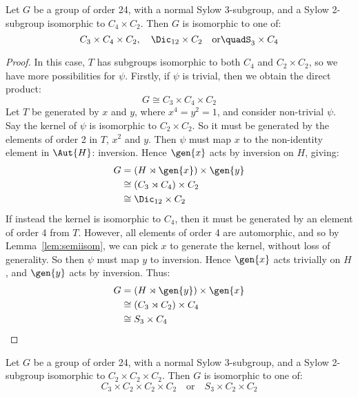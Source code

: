\begin{lemma}
    Let \(G\) be a group of order 24, with a normal Sylow 3-subgroup, and a Sylow 2-subgroup isomorphic to \(C_{4}
    \times C_2\).
    Then \(G\) is isomorphic to one of:
    \[
        C_3 \times C_4 \times C_2, \quad%
        \Dic_{12} \times C_2 \quad \text{or} \quad%
        S_3 \times C_4%
    \]
\end{lemma}

\begin{proof}
    In this case, \(T\) has subgroups isomorphic to both \(C_4\) and \(C_2 \times C_2\), so we have more
    possibilities for \(\psi\).
    Firstly, if \(\psi\) is trivial, then we obtain the direct product:
    \[G \cong C_3 \times C_4 \times C_2\]
    Let \(T\) be generated by \(x\) and \(y\), where \(x^4 = y^2 = 1\), and consider non-trivial \(\psi\).
    Say the kernel of \(\psi\) is isomorphic to \(C_2 \times C_2\).
    So it must be generated by the elements of order 2 in \(T\), \(x^2\) and \(y\).
    Then \(\psi\) must map \(x\) to the non-identity element in \(\Aut{H}\): inversion.
    Hence \(\gen{x}\) acts by inversion on \(H\), giving:
    \begin{equation*}
    \begin{aligned}
        G &= (H \rtimes \gen{x}) \times \gen{y} \\
        &\cong (C_3 \rtimes C_4) \times C_2 \\
        &\cong \Dic_{12} \times C_2
    \end{aligned}
    \end{equation*}
    If instead the kernel is isomorphic to \(C_4\), then it must be generated by an element of order 4 from \(T\).
    However, all elements of order 4 are automorphic, and so by Lemma~\ref{lem:semiisom}, we can pick \(x\) to
    generate the kernel, without loss of generality.
    So then \(\psi\) must map \(y\) to inversion.
    Hence \(\gen{x}\) acts trivially on \(H\), and \(\gen{y}\) acts by inversion.
    Thus:
    \begin{equation*}
    \begin{aligned}
        G &= (H \rtimes \gen{y}) \times \gen{x} \\
        &\cong (C_3 \rtimes C_2) \times C_4 \\
        &\cong S_3 \times C_4
    \end{aligned}
    \end{equation*}
\end{proof}

\begin{lemma}
    Let \(G\) be a group of order 24, with a normal Sylow 3-subgroup, and a Sylow 2-subgroup isomorphic to \(C_2 \times
    C_2 \times C_2\).
    Then \(G\) is isomorphic to one of:
    \[
        C_3 \times C_2 \times C_2 \times C_2 \quad \text{or} \quad%
        S_3 \times C_2 \times C_2
    \]
\end{lemma}

